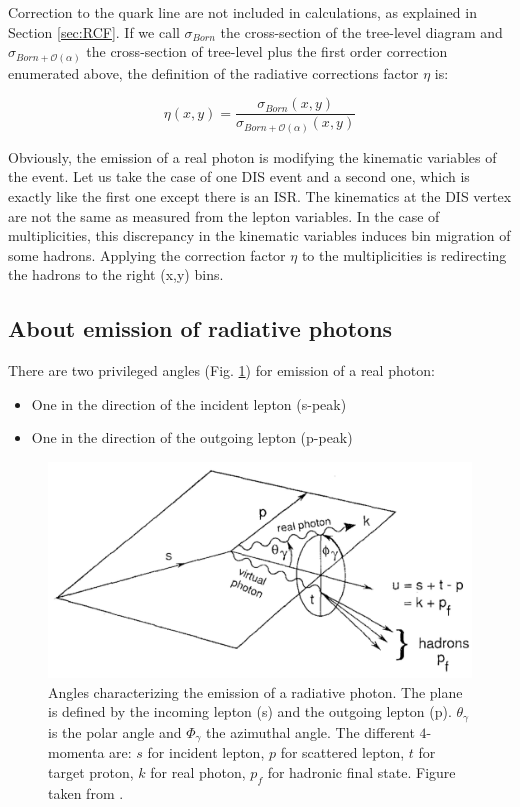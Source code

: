 Correction to the quark line are not included in calculations, as explained in Section \ref{sec:RCF}. If we call $\sigma_{Born}$ the cross-section of the tree-level diagram and $\sigma_{Born+\mathscr{O}(\alpha)}$ the cross-section of tree-level plus the first order correction enumerated above, the definition of the radiative corrections factor $\eta$ is:

\begin{equation} \label{eq:RCF_def}
  \eta(x,y)=\frac{\sigma_{Born}(x,y)}{\sigma_{Born+\mathscr{O}(\alpha)}(x,y)}
\end{equation}

Obviously, the emission of a real photon is modifying the kinematic variables of the event. Let us take the case of one DIS event and a second one, which is exactly like the first one except there is an ISR. The kinematics at the DIS vertex are not the same as measured from the lepton variables. In the case of multiplicities, this discrepancy in the kinematic variables induces bin migration of some hadrons. Applying the correction factor $\eta$ to the multiplicities is redirecting the hadrons to the right (x,y) bins.

\subsection{About emission of radiative photons}

There are two privileged angles (Fig. \ref{fig:plan}) for emission of a real photon:
\begin{itemize}
\item One in the direction of the incident lepton (s-peak)
\item One in the direction of the outgoing lepton (p-peak)
\end{itemize}

\begin{figure}[h!]
\centering
\includegraphics[width=12cm]{gfx/plan_angle.png}
\caption{Angles characterizing the emission of a radiative photon. The plane is defined by the incoming lepton (s) and the outgoing lepton (p). $\theta_\gamma$ is the polar angle and $\Phi_\gamma$ the azimuthal angle. The different $4$-momenta are: $s$ for incident lepton, $p$ for scattered lepton, $t$ for target proton, $k$ for real photon, $p_f$ for hadronic final state. Figure taken from \cite{TERAD2}.}
\label{fig:plan}
\end{figure}

